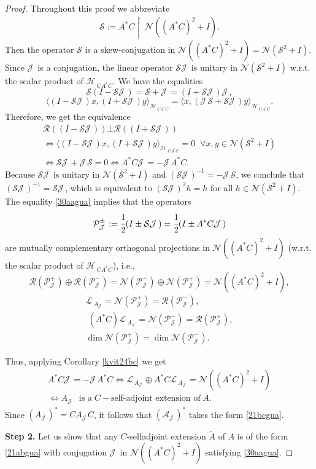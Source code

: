 \documentclass[12pt]{amsart}
\newcommand{\cR}{\mathcal{R}}
\theoremstyle{definition}
\newcommand{\cJ}{\mathcal{J}\,}
\newcommand{\cL}{\mathcal{L}\,}
\newcommand{\cH}{\mathcal{H}\,}
\newcommand{\cA}{\mathcal{A}}
\newcommand{\cN}{\mathcal{N}}
\newcommand{\cS}{\mathcal{S}}
\newcommand{\cP}{\mathcal{P}}
\def\uphar{{\upharpoonright\,}}
\begin{document}
\begin{proof}
Throughout this proof we abbreviate
\begin{align}\label{defics}
\cS:=A^*C\uphar\cN((A^*C)^2+I).
\end{align}
Then the operator $\cS$ is a skew-conjugation  in $ \cN((A^*C)^2+I)=\cN(\cS^2+I).$
Since  $\cJ$ is a conjugation, the linear operator $\cS\cJ$ is unitary in $\cN(\cS^2+I) $ w.r.t. the scalar product of $\cH_{CA^*C}$. We have the equalities
\[
\cS(I-\cS\cJ)=\cS+\cJ=(I+\cS\cJ)\cJ,
\]
\[
\langle (I-\cS \cJ)x,(I+\cS\cJ)y\rangle_{\cH_{CA^*C}}=\langle x, (\cJ\cS+\cS\cJ)y \rangle_{\cH_{CA^*C}}.
\]
Therefore, we get the equivalence
\[
\begin{array}{l}
\cR((I-\cS \cJ))\bot\cR((I+\cS \cJ))\\[2mm]
\Longleftrightarrow\langle (I-\cS \cJ)x,(I+\cS\cJ)y\rangle_{\cH_{CA^*C}}=0\;\;\forall x,y\in\cN(\cS^2+I)\\[2mm]
\Longleftrightarrow \cS\cJ+\cJ\cS=0\Longleftrightarrow A^*C\cJ=-\cJ A^*C.
\end{array}
\]
Because $\cS\cJ$ is unitary in $\cN(\cS^2+I)$ and $(\cS\cJ)^{-1}=-\cJ\cS$, we conclude that $(\cS\cJ)^{-1}=\cS\cJ$, which is equivalent to $(\cS\cJ)^2 h=h$ for all $h\in \cN(\cS^2+I)$.
The equality \eqref{30aagua} implies that the operators
$$\cP_{\cJ}^{\pm}:=\cfrac{1}{2}(I\pm \cS\cJ)=\cfrac{1}{2}(I\pm A^*C\cJ)$$
 are mutually complementary orthogonal projections in $\cN((A^*C)^2+I)$ (w.r.t. the scalar product of $\cH_{CA^*C}$), i.e.,
\[
\cR(\cP^+_{\cJ})\oplus\cR(\cP^-_{\cJ})=\cN(\cP^-_{\cJ})\oplus\cN(\cP^+_{\cJ})=\cN((A^*C)^2+I),
\]
\[
\begin{array}{l}
\cL_{A_{\cJ}}= \cN(\cP^+_{\cJ})=\cR(\cP^-_{\cJ}),\\[2mm]
\;(A^*C)\cL_{A_\cJ}=\cN(\cP^-_{\cJ})=\cR(\cP^+_{\cJ}),\\[2mm]
\dim \cN(\cP^+_{\cJ})=\dim\cN(\cP^-_{\cJ}).
\end{array}
\]

Thus, applying Corollary \ref{kvit24bc} we get
\[
\begin{array}{l}
A^*C\cJ=-\cJ A^*C\Longleftrightarrow \cL_{A_{\cJ}}\oplus A^*C \cL_{A_{\cJ}}=\cN((A^*C)^2+I)\\[2mm]
\Longleftrightarrow A_{\cJ}~~~ \mbox{is a}\; C-\mbox{self-adjoint extension of}\; A.
\end{array}
\]
Since $(A_{\cJ})^*=CA_{\cJ}C$, it follows that $(\cA_{\cJ})^*$ takes the form \eqref{21bcgua}.

\textbf{Step 2.}
Let us show that any $C$-selfadjoint extension $\widetilde A$ of $A$ is of the form \eqref{21abgua} with conjugation $\cJ$ in $\cN((A^*C)^2+I)$ satisfying \eqref{30aagua}.


\end{proof}
\end{document}
